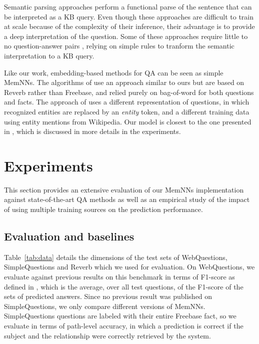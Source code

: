 \documentclass[11pt,a4paper]{article}
\newcommand{\fb}{{\sf Freebase}\xspace}
\newcommand{\wq}{{\sf WebQuestions}\xspace}
\newcommand{\rv}{{\sf Reverb}\xspace}
\newcommand{\fbq}{{\sf SimpleQuestions}\xspace}
\begin{document}
Semantic parsing approaches
\cite{cai-yates:2013:ACL2013,berant-EtAl:2013:EMNLP,kwiatkowski-EtAl:2013:EMNLP,berant2014semantic,fader2014open}
perform a functional parse of the sentence that can be interpreted as
a KB query. Even though these approaches are difficult to train at
scale because of the complexity of their inference, their advantage is
to provide a deep interpretation of the question. Some of these
approaches require little to no question-answer pairs
\cite{paralex,reddy2014large}, relying on simple rules to tranform the
semantic interpretation to a KB query.

Like our work, embedding-based methods for QA can be seen as simple
MemNNs. The algorithms of \cite{bordes2014open,weston2014memory} use
an approach similar to ours but are based on \rv rather than \fb, and
relied purely on bag-of-word for both questions and facts. The
approach of \cite{yang2014joint} uses a different representation of
questions, in which recognized entities are replaced by an {\it
  entity} token, and a different training data using entity
mentions from {\sc Wikipedia}. Our model is closest to the one presented
in \cite{bordes-chopra-weston:2014:EMNLP2014}, which is discussed in
more details in the experiments.



\section{Experiments}
\label{sec:expes}
This section provides an extensive evaluation of our MemNNs
implementation against state-of-the-art QA methods as well as an
empirical study of the impact of using multiple training sources on
the prediction performance.

\subsection{Evaluation and baselines}
 Table~\ref{tab:data} details the dimensions of the test sets of \wq, \fbq
 and \rv which we used for evaluation.
On \wq, we evaluate against previous results on this benchmark
 \cite{berant-EtAl:2013:EMNLP,yao2014information,berant2014semantic,bordes-chopra-weston:2014:EMNLP2014,yang2014joint}
 in terms of F1-score as defined in \cite{berant2014semantic}, which is the
 average, over all test questions, of the F1-score of the sets of
 predicted answers.
Since no previous result was published on \fbq, we only compare
 different versions of MemNNs.  \fbq questions are labeled with their
 entire \fb fact, so we evaluate in terms of path-level
 accuracy, in which a prediction is correct if the subject and the
 relationship were correctly retrieved by the system.
\end{document}
